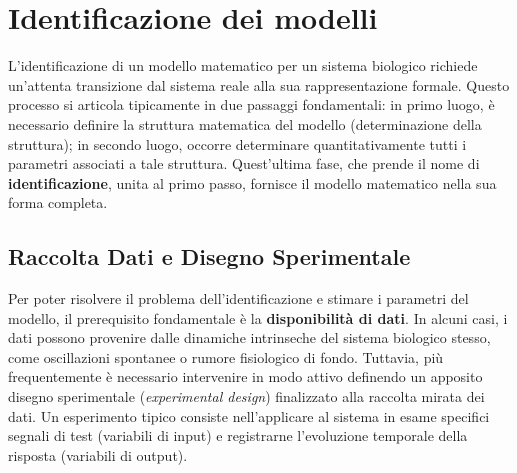 \chapter{Identificazione dei modelli}
L'identificazione di un modello matematico per un sistema biologico richiede un'attenta transizione dal sistema reale alla sua rappresentazione formale. Questo processo si articola tipicamente in due passaggi fondamentali: in primo luogo, è necessario definire la struttura matematica del modello (determinazione della struttura); in secondo luogo, occorre determinare quantitativamente tutti i parametri associati a tale struttura. Quest'ultima fase, che prende il nome di \textbf{identificazione}, unita al primo passo, fornisce il modello matematico nella sua forma completa.

\section{Raccolta Dati e Disegno Sperimentale}
Per poter risolvere il problema dell'identificazione e stimare i parametri del modello, il prerequisito fondamentale è la \textbf{disponibilità di dati}. In alcuni casi, i dati possono provenire dalle dinamiche intrinseche del sistema biologico stesso, come oscillazioni spontanee o rumore fisiologico di fondo. Tuttavia, più frequentemente è necessario intervenire in modo attivo definendo un apposito disegno sperimentale (\emph{experimental design}) finalizzato alla raccolta mirata dei dati. Un esperimento tipico consiste nell'applicare al sistema in esame specifici segnali di test (variabili di input) e registrarne l'evoluzione temporale della risposta (variabili di output).


